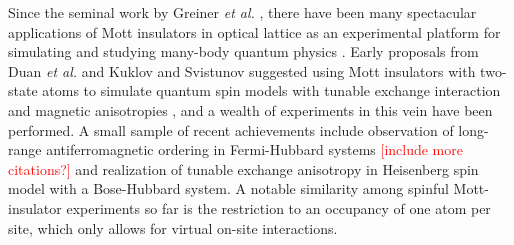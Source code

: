 \documentclass[aps,prl,twocolumn,superscriptaddress]{revtex4-1}
\newcounter{comment}
\newcommand{\comment}[2][]{\todo[color=red!100!green!33, #1]{#2}}
\newcommand{\newmat}[1]{\textcolor{red}{#1}}
\newcommand{\rmtxt}[1]{\st{#1}}
\begin{document}

Since the seminal work by Greiner \emph{et al.} \cite{greiner2002quantum}, there have been many spectacular applications of Mott insulators in optical lattice as an experimental platform for simulating and studying many-body quantum physics \cite{bloch2008many}. Early proposals from Duan \emph {et al.} and Kuklov and Svistunov suggested using Mott insulators with two-state atoms to simulate quantum spin models with tunable exchange interaction and magnetic anisotropies \cite{duan2003controlling,kuklov2003counterflow}, and a wealth of experiments in this vein have been performed. A small sample of recent achievements include observation of long-range antiferromagnetic ordering in Fermi-Hubbard systems \cite{Mazurenko2017} \newmat{[include more citations?]} and realization of tunable exchange anisotropy in Heisenberg spin model with a Bose-Hubbard system. A notable similarity among spinful Mott-insulator experiments so far is the restriction to an occupancy of one atom per site, which only allows for virtual on-site interactions. 
\end{document}
